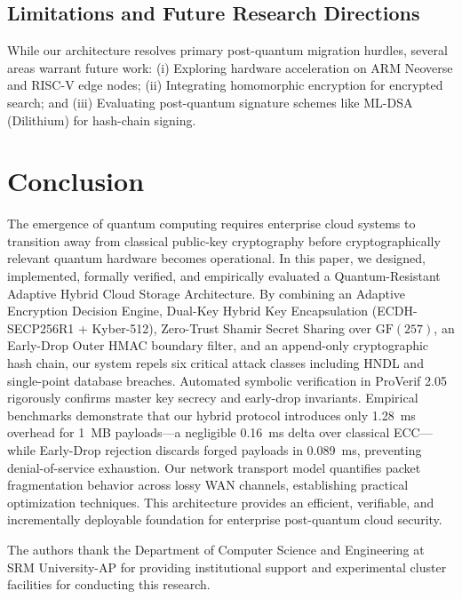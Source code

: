 \documentclass[sn-mathphys,Numbered]{sn-jnl}%
\theoremstyle{thmstyleone}%
\theoremstyle{thmstyletwo}%
\theoremstyle{thmstylethree}%
\begin{document}
\subsection{\textbf{Limitations and Future Research Directions}}
While our architecture resolves primary post-quantum migration hurdles, several areas warrant future work: (i) Exploring hardware acceleration on ARM Neoverse and RISC-V edge nodes; (ii) Integrating homomorphic encryption for encrypted search; and (iii) Evaluating post-quantum signature schemes like ML-DSA (Dilithium) for hash-chain signing.

\section{Conclusion}\label{sec:conclusion}
The emergence of quantum computing requires enterprise cloud systems to transition away from classical public-key cryptography before cryptographically relevant quantum hardware becomes operational. In this paper, we designed, implemented, formally verified, and empirically evaluated a Quantum-Resistant Adaptive Hybrid Cloud Storage Architecture. By combining an Adaptive Encryption Decision Engine, Dual-Key Hybrid Key Encapsulation (ECDH-SECP256R1 + Kyber-512), Zero-Trust Shamir Secret Sharing over $\text{GF}(257)$, an Early-Drop Outer HMAC boundary filter, and an append-only cryptographic hash chain, our system repels six critical attack classes including HNDL and single-point database breaches. Automated symbolic verification in ProVerif 2.05 rigorously confirms master key secrecy and early-drop invariants. Empirical benchmarks demonstrate that our hybrid protocol introduces only 1.28~ms overhead for 1~MB payloads---a negligible 0.16~ms delta over classical ECC---while Early-Drop rejection discards forged payloads in 0.089~ms, preventing denial-of-service exhaustion. Our network transport model quantifies packet fragmentation behavior across lossy WAN channels, establishing practical optimization techniques. This architecture provides an efficient, verifiable, and incrementally deployable foundation for enterprise post-quantum cloud security.

\backmatter

The authors thank the Department of Computer Science and Engineering at SRM University-AP for providing institutional support and experimental cluster facilities for conducting this research.
\end{document}
